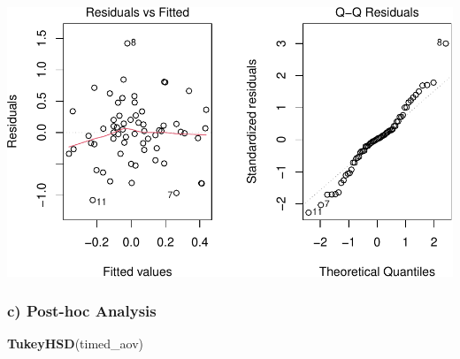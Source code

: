 \documentclass[
]{article}
\newenvironment{Shaded}{\begin{snugshade}}{\end{snugshade}}
\newcommand{\FunctionTok}[1]{\textcolor[rgb]{0.13,0.29,0.53}{\textbf{#1}}}
\newcommand{\NormalTok}[1]{#1}
\begin{document}
\includegraphics{island_caffeine_files/figure-latex/diagnostic-1.pdf}

\subsubsection{c) Post-hoc Analysis}\label{c-post-hoc-analysis}

\begin{Shaded}
\begin{Highlighting}[]
\FunctionTok{TukeyHSD}\NormalTok{(timed\_aov)}
\end{Highlighting}
\end{Shaded}
\end{document}
